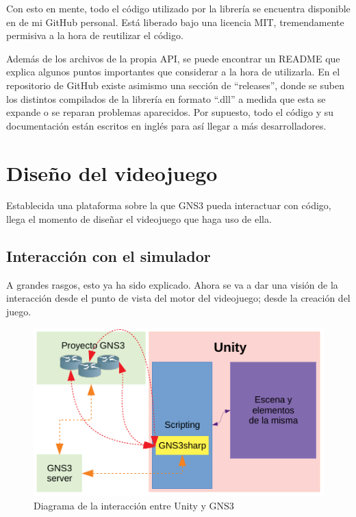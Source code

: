 Con esto en mente, todo el código utilizado por la librería se encuentra disponible en  de mi GitHub personal. Está liberado bajo una licencia MIT, tremendamente permisiva a la hora de reutilizar el código.

Además de los archivos de la propia API, se puede encontrar un README que explica algunos puntos importantes que considerar a la hora de utilizarla. En el repositorio de GitHub existe asimismo una sección de ``releases'', donde se suben los distintos compilados de la librería en formato ``.dll'' a medida que esta se expande o se reparan problemas aparecidos. Por supuesto, todo el código y su documentación están escritos en inglés para así llegar a más desarrolladores.

\section{Diseño del videojuego}
Establecida una plataforma sobre la que GNS3 pueda interactuar con código, llega el momento de diseñar el videojuego que haga uso de ella. 

\subsection{Interacción con el simulador}
A grandes rasgos, esto ya ha sido explicado. Ahora se va a dar una visión de la interacción desde el punto de vista del motor del videojuego; desde la creación del juego.

\begin{figure}[H]
  \centering
  \includegraphics[scale=1.4]{imagenes/diagrama_interaccion}
  \caption{Diagrama de la interacción entre Unity y GNS3}
  \label{fig:diagrama_interaccion}
\end{figure}

